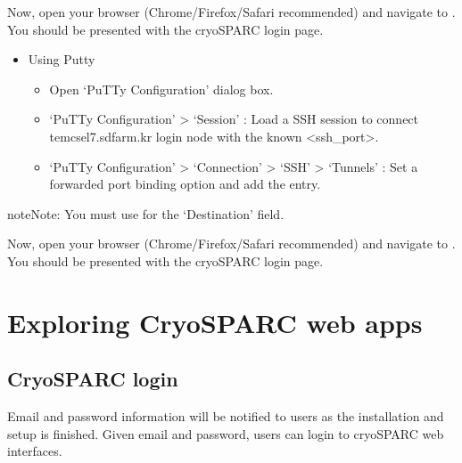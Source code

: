 \documentclass[a4paper,10pt,english]{sphinxmanual}
\begin{document}

\sphinxAtStartPar
Now, open your browser (Chrome/Firefox/Safari recommended) and navigate to . You should be presented with the cryoSPARC login page.
\begin{itemize}
\item {} 
\sphinxAtStartPar
Using Putty
\begin{itemize}
\item {} 
\sphinxAtStartPar
Open ‘PuTTy Configuration’ dialog box.

\item {} 
\sphinxAtStartPar
‘PuTTy Configuration’ \sphinxhyphen{}> ‘Session’ : Load a SSH session to connect tem\sphinxhyphen{}cs\sphinxhyphen{}el7.sdfarm.kr login node with the known <ssh\_port>.

\item {} 
\sphinxAtStartPar
‘PuTTy Configuration’ \sphinxhyphen{}> ‘Connection’ \sphinxhyphen{}> ‘SSH’ \sphinxhyphen{}> ‘Tunnels’ : Set a forwarded port binding option and add the entry.

\end{itemize}

\end{itemize}

\begin{sphinxadmonition}{note}{Note:}
\sphinxAtStartPar
You must use  for the ‘Destination’ field.
\end{sphinxadmonition}


\sphinxAtStartPar
Now, open your browser (Chrome/Firefox/Safari recommended) and navigate to . You should be presented with the cryoSPARC login page.


\section{Exploring CryoSPARC web apps}
\label{\detokenize{cryoSPARC:exploring-cryosparc-web-apps}}

\subsection{CryoSPARC login}
\label{\detokenize{cryoSPARC:cryosparc-login}}
\sphinxAtStartPar
E\sphinxhyphen{}mail and password information will be notified to users as the installation and setup is finished.
Given e\sphinxhyphen{}mail and password, users can login to cryoSPARC web interfaces.
\end{document}
